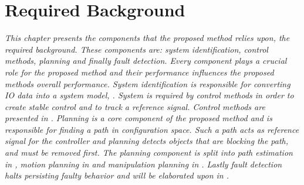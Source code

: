 \chapter{Required Background}%
\label{chap:required_background}
\textit{This chapter presents the components that the proposed method relies upon, the required background. These components are: system identification, control methods, planning and finally fault detection. Every component plays a crucial role for the proposed method and their performance influences the proposed methods overall performance. System identification is responsible for converting \ac{IO} data into a system model, . System is required by control methods in order to create stable control and to track a reference signal. Control methods are presented in . Planning is a core component of the proposed method and is responsible for finding a path in configuration space. Such a path acts as reference signal for the controller and planning detects objects that are blocking the path, and must be removed first. The planning component is split into path estimation in , motion planning in  and manipulation planning in . Lastly fault detection halts persisting faulty behavior and will be elaborated upon in .\bs}

% 






